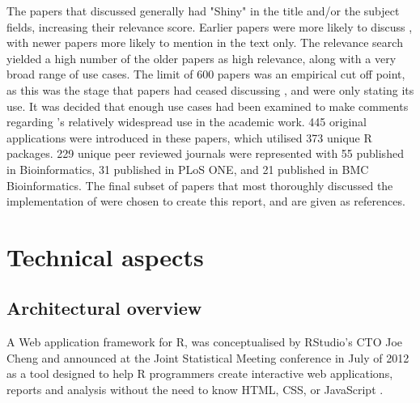 The papers that discussed  generally had "Shiny" in the title and/or the subject fields, increasing their relevance score. Earlier papers were more likely to discuss , with newer papers more likely to mention  in the text only. The relevance search yielded a high number of the older papers as high relevance, along with a very broad range of use cases. The limit of 600 papers was an empirical cut off point, as this was the stage that papers had ceased discussing , and were only stating its use.  It was decided that enough use cases had been examined to make comments regarding 's relatively widespread use in the academic work. 445 original applications were introduced in these papers, which utilised 373 unique R packages. 229 unique peer reviewed journals were represented with 55 published in Bioinformatics, 31 published in PLoS ONE, and 21 published in BMC Bioinformatics. The final subset of papers that most thoroughly discussed the implementation of  were chosen to create this report, and are given as references.


\section{Technical aspects}

\subsection{Architectural overview}
A Web application framework for R,  was conceptualised by RStudio's CTO Joe Cheng and announced at the Joint Statistical Meeting conference in July of 2012 as a tool designed to help R programmers create interactive web applications, reports and analysis without the need to know HTML, CSS, or JavaScript \citep{chang_shiny_2018}.

